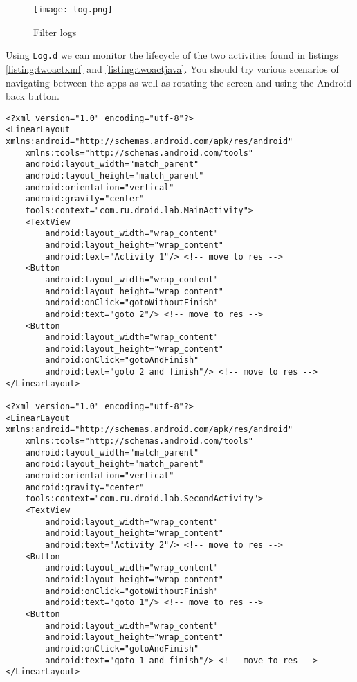 \begin{figure}[H]
\centering
\texttt{[image: log.png]}
\caption{Filter logs}
\label{fig:logfilt}
\end{figure}

Using \texttt{Log.d} we can monitor the lifecycle of the two activities found in listings \ref{listing:twoactxml} and \ref{listing:twoactjava}. You should try various scenarios of navigating between the apps as well as rotating the screen and using the Android back button.

\begin{lstlisting}[style=A_XML,caption={Two layouts for two activities},label={listing:twoactxml}]
<?xml version="1.0" encoding="utf-8"?>
<LinearLayout xmlns:android="http://schemas.android.com/apk/res/android"
    xmlns:tools="http://schemas.android.com/tools"
    android:layout_width="match_parent"
    android:layout_height="match_parent"
    android:orientation="vertical"
    android:gravity="center"
    tools:context="com.ru.droid.lab.MainActivity">
    <TextView
        android:layout_width="wrap_content"
        android:layout_height="wrap_content"
        android:text="Activity 1"/> <!-- move to res -->
    <Button
        android:layout_width="wrap_content"
        android:layout_height="wrap_content"
        android:onClick="gotoWithoutFinish"
        android:text="goto 2"/> <!-- move to res -->
    <Button
        android:layout_width="wrap_content"
        android:layout_height="wrap_content"
        android:onClick="gotoAndFinish"
        android:text="goto 2 and finish"/> <!-- move to res -->
</LinearLayout>

<?xml version="1.0" encoding="utf-8"?>
<LinearLayout xmlns:android="http://schemas.android.com/apk/res/android"
    xmlns:tools="http://schemas.android.com/tools"
    android:layout_width="match_parent"
    android:layout_height="match_parent"
    android:orientation="vertical"
    android:gravity="center"
    tools:context="com.ru.droid.lab.SecondActivity">
    <TextView
        android:layout_width="wrap_content"
        android:layout_height="wrap_content"
        android:text="Activity 2"/> <!-- move to res -->
    <Button
        android:layout_width="wrap_content"
        android:layout_height="wrap_content"
        android:onClick="gotoWithoutFinish"
        android:text="goto 1"/> <!-- move to res -->
    <Button
        android:layout_width="wrap_content"
        android:layout_height="wrap_content"
        android:onClick="gotoAndFinish"
        android:text="goto 1 and finish"/> <!-- move to res -->
</LinearLayout>

\end{lstlisting}

